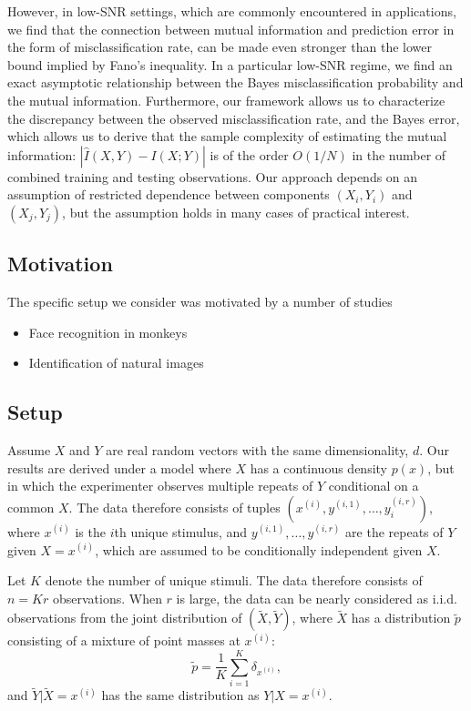 \documentclass[12pt]{article}
\begin{document}
However, in low-SNR settings, which are commonly encountered in
applications, we find that the connection between mutual information
and prediction error in the form of misclassification rate, can be
made even stronger than the lower bound implied by Fano's inequality.
In a particular low-SNR regime, we find an exact asymptotic
relationship between the Bayes misclassification probability and the
mutual information.  Furthermore, our framework allows us to
characterize the discrepancy between the observed misclassification
rate, and the Bayes error, which allows us to derive that the sample
complexity of estimating the mutual information: $|\hat{I}(X,Y)-
I(X;Y)|$ is of the order $O(1/N)$ in the number of combined training
and testing observations.  Our approach depends on an assumption of
restricted dependence between components $(X_i, Y_i)$ and $(X_j,
Y_j)$, but the assumption holds in many cases of practical interest.

\subsection{Motivation}

The specific setup we consider was motivated by a number of studies
\begin{itemize}
\item Face recognition in monkeys
\item Identification of natural images
\end{itemize}

\subsection{Setup}

Assume $X$ and $Y$ are real random vectors with the same
dimensionality, $d$.  Our results are derived under a model where $X$
has a continuous density $p(x)$, but in which the experimenter
observes multiple repeats of $Y$ conditional on a common $X$.  The
data therefore consists of tuples $(x^{(i)}, y^{(i, 1)}, \hdots,
y_i^{(i, r)})$, where $x^{(i)}$ is the $i$th unique stimulus, and
$y^{(i, 1)},\hdots, y^{(i, r)}$ are the repeats of $Y$ given $X =
x^{(i)}$, which are assumed to be conditionally independent given $X$.

Let $K$ denote the number of unique stimuli.  The data therefore
consists of $n = Kr$ observations.  When $r$ is large, the data can be
nearly considered as i.i.d. observations from the joint distribution
of $(\tilde{X}, \tilde{Y})$, where $\tilde{X}$ has a distribution
$\tilde{p}$ consisting of a mixture of point masses at $x^{(i)}$:
\[
\tilde{p} = \frac{1}{K}\sum_{i=1}^K \delta_{x^{(i)}},
\]
and $\tilde{Y}|\tilde{X} = x^{(i)}$ has the same distribution as $Y|X
= x^{(i)}$.
\end{document}
